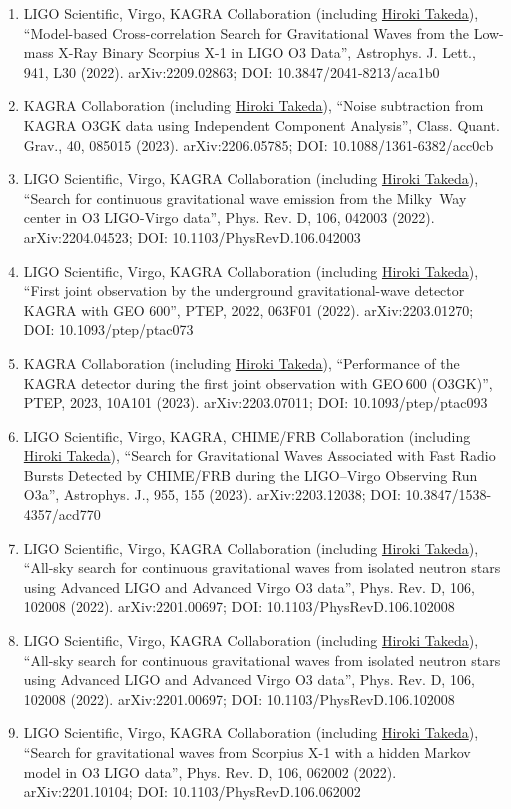 \documentclass[uplatex, 11pt]{jsarticle}
\begin{document}
\begin{enumerate}
\item LIGO Scientific, Virgo, KAGRA Collaboration (including \uline{Hiroki Takeda}), “Model-based Cross-correlation Search for Gravitational Waves from the Low-mass X-Ray Binary Scorpius X-1 in LIGO O3 Data”, Astrophys. J. Lett., 941, L30 (2022). arXiv:2209.02863; DOI: 10.3847/2041-8213/aca1b0
\item KAGRA Collaboration (including \uline{Hiroki Takeda}), “Noise subtraction from KAGRA O3GK data using Independent Component Analysis”, Class. Quant. Grav., 40, 085015 (2023). arXiv:2206.05785; DOI: 10.1088/1361-6382/acc0cb
\item LIGO Scientific, Virgo, KAGRA Collaboration (including \uline{Hiroki Takeda}), “Search for continuous gravitational wave emission from the Milky~Way center in O3 LIGO-Virgo data”, Phys. Rev. D, 106, 042003 (2022). arXiv:2204.04523; DOI: 10.1103/PhysRevD.106.042003
\item LIGO Scientific, Virgo, KAGRA Collaboration (including \uline{Hiroki Takeda}), “First joint observation by the underground gravitational-wave detector KAGRA with GEO 600”, PTEP, 2022, 063F01 (2022). arXiv:2203.01270; DOI: 10.1093/ptep/ptac073
\item KAGRA Collaboration (including \uline{Hiroki Takeda}), “Performance of the KAGRA detector during the first joint observation with GEO\,600 (O3GK)”, PTEP, 2023, 10A101 (2023). arXiv:2203.07011; DOI: 10.1093/ptep/ptac093
\item LIGO Scientific, Virgo, KAGRA, CHIME/FRB Collaboration (including \uline{Hiroki Takeda}), “Search for Gravitational Waves Associated with Fast Radio Bursts Detected by CHIME/FRB during the LIGO--Virgo Observing Run O3a”, Astrophys. J., 955, 155 (2023). arXiv:2203.12038; DOI: 10.3847/1538-4357/acd770
\item LIGO Scientific, Virgo, KAGRA Collaboration (including \uline{Hiroki Takeda}), “All-sky search for continuous gravitational waves from isolated neutron stars using Advanced LIGO and Advanced Virgo O3 data”, Phys. Rev. D, 106, 102008 (2022). arXiv:2201.00697; DOI: 10.1103/PhysRevD.106.102008
\item LIGO Scientific, Virgo, KAGRA Collaboration (including \uline{Hiroki Takeda}), “All-sky search for continuous gravitational waves from isolated neutron stars using Advanced LIGO and Advanced Virgo O3 data”, Phys. Rev. D, 106, 102008 (2022). arXiv:2201.00697; DOI: 10.1103/PhysRevD.106.102008
\item LIGO Scientific, Virgo, KAGRA Collaboration (including \uline{Hiroki Takeda}), “Search for gravitational waves from Scorpius X-1 with a hidden Markov model in O3 LIGO data”, Phys. Rev. D, 106, 062002 (2022). arXiv:2201.10104; DOI: 10.1103/PhysRevD.106.062002

\end{enumerate}
\end{document}
